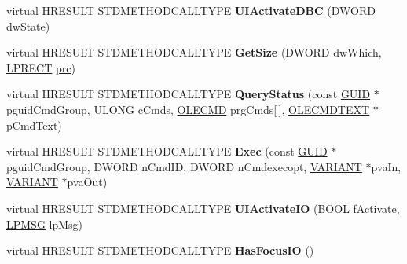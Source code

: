 \begin{DoxyCompactItemize}
\item 
\mbox{\label{class_c_band_site_base_a441fa83da987187eba1e2883430dbcc2}} 
virtual H\+R\+E\+S\+U\+LT S\+T\+D\+M\+E\+T\+H\+O\+D\+C\+A\+L\+L\+T\+Y\+PE {\bfseries U\+I\+Activate\+D\+BC} (D\+W\+O\+RD dw\+State)
\item 
\mbox{\label{class_c_band_site_base_a209bdb77c7fcea444b79cd43684c50af}} 
virtual H\+R\+E\+S\+U\+LT S\+T\+D\+M\+E\+T\+H\+O\+D\+C\+A\+L\+L\+T\+Y\+PE {\bfseries Get\+Size} (D\+W\+O\+RD dw\+Which, \hyperlink{structtag_r_e_c_t}{L\+P\+R\+E\+CT} \hyperlink{structtag_r_e_c_t}{prc})
\item 
\mbox{\label{class_c_band_site_base_ae23dc4d0173ae99b2c3329d857e698f4}} 
virtual H\+R\+E\+S\+U\+LT S\+T\+D\+M\+E\+T\+H\+O\+D\+C\+A\+L\+L\+T\+Y\+PE {\bfseries Query\+Status} (const \hyperlink{interface_g_u_i_d}{G\+U\+ID} $\ast$pguid\+Cmd\+Group, U\+L\+O\+NG c\+Cmds, \hyperlink{struct_i_ole_command_target_1_1__tag_o_l_e_c_m_d}{O\+L\+E\+C\+MD} prg\+Cmds\mbox{[}$\,$\mbox{]}, \hyperlink{struct_i_ole_command_target_1_1__tag_o_l_e_c_m_d_t_e_x_t}{O\+L\+E\+C\+M\+D\+T\+E\+XT} $\ast$p\+Cmd\+Text)
\item 
\mbox{\label{class_c_band_site_base_a2600ce89dd6a8ad559ebbb963f9a3d8e}} 
virtual H\+R\+E\+S\+U\+LT S\+T\+D\+M\+E\+T\+H\+O\+D\+C\+A\+L\+L\+T\+Y\+PE {\bfseries Exec} (const \hyperlink{interface_g_u_i_d}{G\+U\+ID} $\ast$pguid\+Cmd\+Group, D\+W\+O\+RD n\+Cmd\+ID, D\+W\+O\+RD n\+Cmdexecopt, \hyperlink{structtag_v_a_r_i_a_n_t}{V\+A\+R\+I\+A\+NT} $\ast$pva\+In, \hyperlink{structtag_v_a_r_i_a_n_t}{V\+A\+R\+I\+A\+NT} $\ast$pva\+Out)
\item 
\mbox{\label{class_c_band_site_base_ad8074b47a08597b6c57b3ef653092420}} 
virtual H\+R\+E\+S\+U\+LT S\+T\+D\+M\+E\+T\+H\+O\+D\+C\+A\+L\+L\+T\+Y\+PE {\bfseries U\+I\+Activate\+IO} (B\+O\+OL f\+Activate, \hyperlink{structtag_m_s_g}{L\+P\+M\+SG} lp\+Msg)
\item 
\mbox{\label{class_c_band_site_base_a50e76f152aec22af24beaaf7d0824c04}} 
virtual H\+R\+E\+S\+U\+LT S\+T\+D\+M\+E\+T\+H\+O\+D\+C\+A\+L\+L\+T\+Y\+PE {\bfseries Has\+Focus\+IO} ()
\item 
\mbox{\label{class_c_band_site_base_aac3c51e6c16fab5580d1bf610d6723d0}} 

\end{DoxyCompactItemize}

